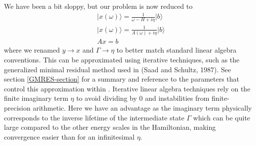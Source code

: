 \documentclass[11pt]{report}
\begin{document}
We have been a bit sloppy, but our problem is now reduced to 
\begin{align}
&\vert x(\omega) \rangle = \frac{1}{\omega - H + i\eta} \vert b \rangle \nonumber \\
&\vert x(\omega) \rangle = \frac{1}{A(\omega) + i\eta} \vert b \rangle \nonumber \\
&Ax = b \nonumber
\end{align}
where we renamed $y\rightarrow x$ and $\Gamma \rightarrow \eta$ to better match standard linear algebra conventions. 
This can be approximated using iterative techniques, such as the generalized minimal residual method used in  (Saad and Schultz, 1987). 
See section \ref{GMRES-section} for a summary and reference to the parameters that control this approximation within .
Iterative linear algebra techniques rely on the finite imaginary term $\eta$ to avoid dividing by 0 and instabilities from finite-precision arithmetic. 
Here we have an advantage as the imaginary term physically corresponds to the inverse lifetime of the intermediate state $\Gamma$ which can be quite large compared to the other energy scales in the Hamiltonian, making convergence easier than for an infinitesimal $\eta$.
\end{document}
